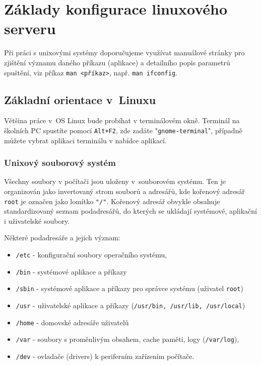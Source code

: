 \section{Základy konfigurace linuxového serveru} \label{basics}
Při práci s unixovými systémy doporučujeme využívat manuálové stránky pro zjištění významu daného příkazu (aplikace) a detailního popis parametrů spuštění, viz příkaz {\tt man <příkaz>}, např. {\tt man ifconfig}.
\subsection{Základní orientace v~Linuxu}
Většina práce v~OS Linux bude probíhat v terminálovém okně. Terminál na školních PC spustíte pomocí \texttt{Alt+F2}, zde zadáte "\texttt{gnome-terminal}", případně můžete vybrat aplikaci terminálu v nabídce aplikací.

\subsubsection{Unixový souborový systém}
Všechny soubory v počítači jsou uloženy v~souborovém systému. Ten je organizován jako invertovaný strom souborů a adresářů, kde kořenový adresář \texttt{root} je označen jako lomítko  \texttt{"/"}. Kořenový adresář obvykle obsahuje standardizovaný seznam podadresářů, do kterých se ukládají systémové, aplikační i uživatelské soubory. 

Některé podadresáře a jejich význam:
\begin{itemize}
  \item {\tt /etc} - konfigurační soubory operačního systému,
  \item {\tt /bin} - systémové aplikace a příkazy
  \item {\tt /sbin} - systémové aplikace a příkazy pro správce systému (uživatel {\tt root})
  \item {\tt /usr} - uživatelské aplikace a příkazy ({\tt /usr/bin, /usr/lib, /usr/local})
  \item {\tt /home} - domovské adresáře uživatelů
  \item {\tt /var} - soubory s proměnlivým obsahem, cache paměti, logy (\texttt{/var/log}),
  \item {\tt /dev} - ovladače (drivers) k periferním zařízením počítače.
\end{itemize}

